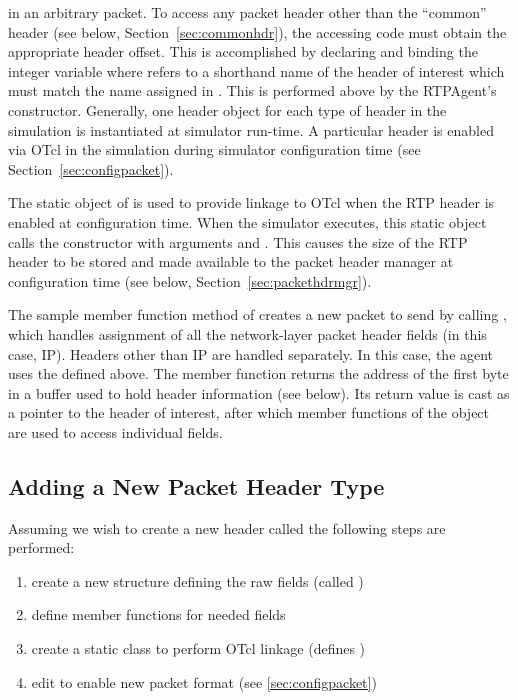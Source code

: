 in an arbitrary packet.
To access any packet header other than the ``common'' header
(see below, Section~\ref{sec:commonhdr}),
the accessing code must obtain the appropriate header offset.
This is accomplished by declaring and binding
the integer variable 
where  refers to a shorthand name
of the header of interest which must match the
name assigned in .
This is performed above by the RTPAgent's constructor.
Generally, one header object for each type of header
in the simulation is instantiated at simulator run-time.
A particular header is enabled via OTcl in the simulation during
simulator configuration time (see Section~\ref{sec:configpacket}).

The static object  of
is used to provide linkage to OTcl when the RTP header is
enabled at configuration time.
When the simulator executes, this static object calls
the  constructor with arguments
 and .
This causes the size of the RTP header to be stored
and made available to the packet header manager
at configuration time (see below, Section~\ref{sec:packethdrmgr}).

The sample member function  method
of  creates a new packet
to send by calling , which handles assignment
of all the network-layer packet header fields (in this case, IP).
Headers other than IP are handled separately.
In this case, the agent uses the  defined above.
The  member function returns the address
of the first byte in a buffer used to hold header information (see below).
Its return value is cast as a pointer to the header of interest,
after which member functions of the 
object are used to access individual fields.

\subsection{Adding a New Packet Header Type}

Assuming we wish to create a new header called 
the following steps are performed:
\begin{enumerate}\itemsep0pt
  \item create a new structure defining the raw fields
        (called )
  \item define member functions for needed fields
  \item create a static class to perform OTcl linkage
        (defines )
  \item edit  to enable new packet format
        (see \ref{sec:configpacket})
\end{enumerate}

